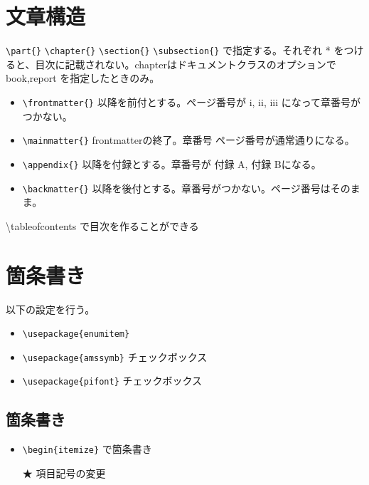 \documentclass[draft]{jlreq} %
\begin{document}
\section{文章構造}

\verb|\part{}| \verb|\chapter{}| \verb|\section{}| \verb|\subsection{}| で指定する。それぞれ * をつけると、目次に記載されない。chapterはドキュメントクラスのオプションで book,report を指定したときのみ。

\begin{itemize}
 \item \verb|\frontmatter{}| 以降を前付とする。ページ番号が i, ii, iii になって章番号がつかない。
 \item \verb|\mainmatter{}| frontmatterの終了。章番号 ページ番号が通常通りになる。
 \item \verb|\appendix{}| 以降を付録とする。章番号が 付録 A, 付録 Bになる。
 \item \verb|\backmatter{}| 以降を後付とする。章番号がつかない。ページ番号はそのまま。
\end{itemize}

\textbackslash tableofcontents で目次を作ることができる


\section{箇条書き}

以下の設定を行う。
\begin{itemize}
 \item \verb|\usepackage{enumitem}|
 \item \verb|\usepackage{amssymb}| チェックボックス
 \item \verb|\usepackage{pifont}| チェックボックス
\end{itemize}

\subsection{箇条書き}
\begin{itemize}
 \item \verb|\begin{itemize}| で箇条書き
 \item[★] 項目記号の変更
\end{itemize}
\end{document}
